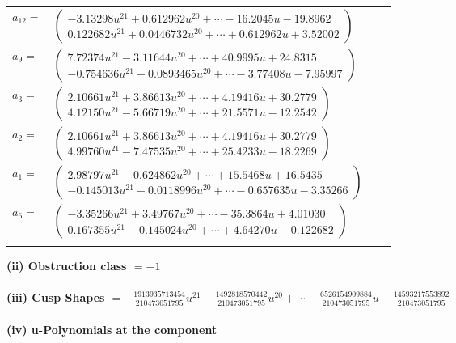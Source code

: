 \documentclass[1p]{elsarticle_modified}
\theoremstyle{definition}
\begin{document}
\begin{tabular}{m{7pt} m{180pt} m{7pt} m{180pt} }
\flushright $a_{12}=$&$\begin{pmatrix}-3.13298 u^{21}+0.612962 u^{20}+\cdots-16.2045 u-19.8962\\0.122682 u^{21}+0.0446732 u^{20}+\cdots+0.612962 u+3.52002\end{pmatrix}$ \\
\flushright $a_{9}=$&$\begin{pmatrix}7.72374 u^{21}-3.11644 u^{20}+\cdots+40.9995 u+24.8315\\-0.754636 u^{21}+0.0893465 u^{20}+\cdots-3.77408 u-7.95997\end{pmatrix}$ \\
\flushright $a_{3}=$&$\begin{pmatrix}2.10661 u^{21}+3.86613 u^{20}+\cdots+4.19416 u+30.2779\\4.12150 u^{21}-5.66719 u^{20}+\cdots+21.5571 u-12.2542\end{pmatrix}$ \\
\flushright $a_{2}=$&$\begin{pmatrix}2.10661 u^{21}+3.86613 u^{20}+\cdots+4.19416 u+30.2779\\4.99760 u^{21}-7.47535 u^{20}+\cdots+25.4233 u-18.2269\end{pmatrix}$ \\
\flushright $a_{1}=$&$\begin{pmatrix}2.98797 u^{21}-0.624862 u^{20}+\cdots+15.5468 u+16.5435\\-0.145013 u^{21}-0.0118996 u^{20}+\cdots-0.657635 u-3.35266\end{pmatrix}$ \\
\flushright $a_{6}=$&$\begin{pmatrix}-3.35266 u^{21}+3.49767 u^{20}+\cdots-35.3864 u+4.01030\\0.167355 u^{21}-0.145024 u^{20}+\cdots+4.64270 u-0.122682\end{pmatrix}$\\&\end{tabular}
\flushleft \textbf{(ii) Obstruction class $= -1$}\\~\\
\flushleft \textbf{(iii) Cusp Shapes $= -\frac{1913935713454}{210473051795} u^{21}-\frac{1492818570442}{210473051795} u^{20}+\cdots-\frac{6526154909884}{210473051795} u-\frac{14593217553892}{210473051795}$}\\~\\
\newpage\renewcommand{\arraystretch}{1}
\flushleft \textbf{(iv) u-Polynomials at the component}\newline \\
\end{document}
